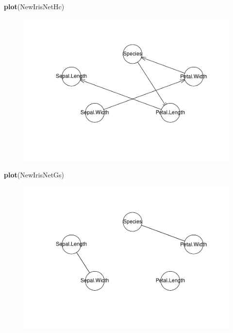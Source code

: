 \documentclass[]{article}
\newenvironment{Shaded}{\begin{snugshade}}{\end{snugshade}}
\newcommand{\KeywordTok}[1]{\textcolor[rgb]{0.13,0.29,0.53}{\textbf{{#1}}}}
\newcommand{\NormalTok}[1]{{#1}}
\begin{document}
\begin{Shaded}
\begin{Highlighting}[]
\KeywordTok{plot}\NormalTok{(NewIrisNetHc)}
\end{Highlighting}
\end{Shaded}

\begin{figure}[htbp]
\centering
\includegraphics{BN_Ass2_files/figure-latex/unnamed-chunk-13-1.pdf}
\end{figure}

\begin{Shaded}
\begin{Highlighting}[]
\KeywordTok{plot}\NormalTok{(NewIrisNetGs)}
\end{Highlighting}
\end{Shaded}

\begin{figure}[htbp]
\centering
\includegraphics{BN_Ass2_files/figure-latex/unnamed-chunk-13-2.pdf}
\end{figure}
\end{document}
